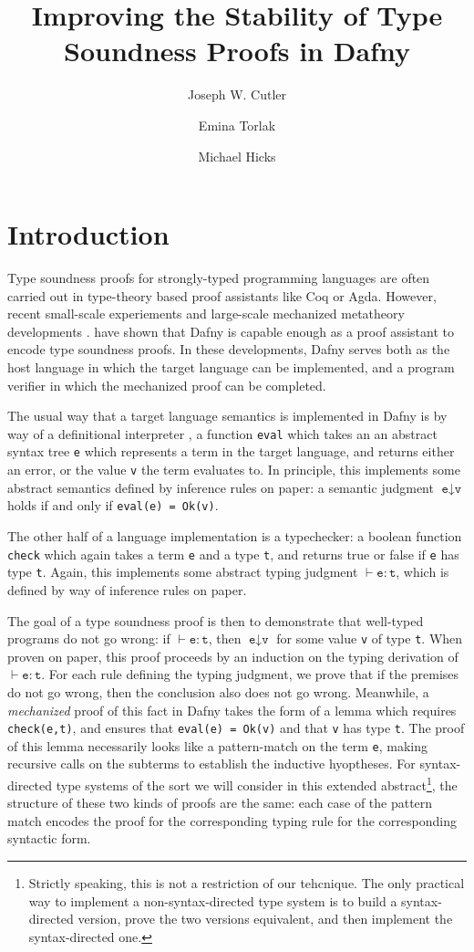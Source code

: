 \documentclass[sigplan,review,screen,anonymous]{acmart}
\author{Joseph W. Cutler}
\affiliation{%
  \institution{University of Pennsylvania}
  \city{Philadelphia}
  \state{Pennsylvania}
  \country{USA}
}
\author{Emina Torlak}
\affiliation{%
  \institution{Amazon Web Services}
  \city{Seattle}
  \state{Washington}
  \country{USA}
}
\author{Michael Hicks}
\affiliation{%
  \institution{Amazon Web Services}
  \city{Arlington}
  \state{Virginia}
  \country{USA}
}
\title{Improving the Stability of Type Soundness Proofs in Dafny}
\begin{document}
\maketitle

\section{Introduction}
Type soundness proofs for strongly-typed programming languages are often carried
out in type-theory based proof assistants like Coq or Agda. However, recent
small-scale experiements \cite{mayer-blog-post} and large-scale mechanized
metatheory developments \cite{cedar-proofs}.  have shown that Dafny is capable
enough as a proof assistant to encode type soundness proofs. In these
developments, Dafny serves both as the host language in which the target
language can be implemented, and a program verifier in which the mechanized
proof can be completed.

The usual way that a target language semantics is implemented in Dafny
is by way of a definitional interpreter \cite{definitional-interpreters}, a function \texttt{eval} which takes an
an abstract syntax tree \texttt{e} which represents a term in the target language, and returns either an error,
or the value \texttt{v} the term evaluates to. In principle, this implements some abstract semantics defined
by inference rules on paper: a semantic judgment $\texttt{e} \downarrow \texttt{v}$ holds if and only if \texttt{eval(e) = Ok(v)}.

The other half of a language implementation is a typechecker: a boolean function \texttt{check} which again takes a term \texttt{e}
and a type \texttt{t}, and returns true or false if \texttt{e} has type \texttt{t}. Again, this implements some abstract typing
judgment $\vdash \texttt{e} : \texttt{t}$, which is defined by way of inference rules on paper. 

The goal of a type soundness proof is then to demonstrate that well-typed
programs do not go wrong: if $\vdash \texttt{e} : \texttt{t}$, then $\texttt{e}
\downarrow \texttt{v}$ for some value \texttt{v} of type \texttt{t}. When proven
on paper, this proof proceeds by an induction on the typing derivation of
$\vdash \texttt{e} : \texttt{t}$. For each rule defining the typing judgment, we
prove that if the premises do not go wrong, then the conclusion also does not go
wrong. Meanwhile, a \emph{mechanized} proof of this fact in Dafny takes the form
of a lemma which requires \texttt{check(e,t)}, and ensures that \texttt{eval(e)
= Ok(v)} and that \texttt{v} has type \texttt{t}. The proof of this lemma
necessarily looks like a pattern-match on the term \texttt{e}, making recursive
calls on the subterms to establish the inductive hyoptheses. For syntax-directed type systems
of the sort we will consider in this extended abstract\footnote{Strictly speaking, this is not a restriction of our tehcnique. The only practical way to implement a non-syntax-directed type system is to build a syntax-directed version, prove the two versions equivalent, and then implement the syntax-directed one.},
the structure of these two kinds of proofs are the same: each case of the pattern match encodes the proof for the corresponding typing rule for the corresponding syntactic form.
\end{document}
